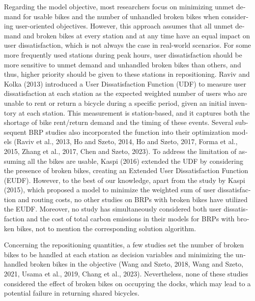 \documentclass[
  english,
]{article}
\newcounter{none} %
\begin{document}
\begin{otherlanguage}{english}
\protect{}\label{p0135}
Regarding the model objective, most researchers focus on minimizing unmet demand for usable bikes
and the number of unhandled broken bikes when considering user-oriented objectives. However, this
approach assumes that all unmet demand and broken bikes at every station and at any time have an
equal impact on user dissatisfaction, which is not always the case in real-world scenarios. For some
more frequently used stations during peak hours, user dissatisfaction should be more sensitive to
unmet demand and unhandled broken bikes than others, and thus, higher priority should be given to
these stations in repositioning. Raviv and Kolka (2013) introduced a User Dissatisfaction Function
(UDF) to measure user dissatisfaction at each station as the expected weighted number of users who
are unable to rent or return a bicycle during a specific period, given an initial inventory at each
station. This measurement is station-based, and it captures both the shortage of bike rent/return
demand and the timing of these events. Several subsequent BRP studies also incorporated the function
into their optimization models (Raviv et al., 2013, Ho and Szeto, 2014, Ho and Szeto, 2017, Forma et
al., 2015, Zhang et al., 2017, Chen and Szeto, 2023). To address the limitation of assuming all the
bikes are usable, Kaspi (2016) extended the UDF by considering the presence of broken bikes,
creating an Extended User Dissatisfaction Function (EUDF). However, to the best of our knowledge,
apart from the study by Kaspi (2015), which proposed a model to minimize the weighted sum of user
dissatisfaction and routing costs, no other studies on BRPs with broken bikes have utilized the
EUDF. Moreover, no study has simultaneously considered both user dissatisfaction and the cost of
total carbon emissions in their models for BRPs with broken bikes, not to mention the corresponding
solution algorithm.

\protect{}\label{p0140}
Concerning the repositioning quantities, a few studies set the number of broken bikes to be handled
at each station as decision variables and minimizing the unhandled broken bikes in the objective
(Wang and Szeto, 2018, Wang and Szeto, 2021, Usama et al., 2019, Chang et al., 2023). Nevertheless,
none of these studies considered the effect of broken bikes on occupying the docks, which may lead
to a potential failure in returning shared bicycles.


\end{otherlanguage}
\end{document}
